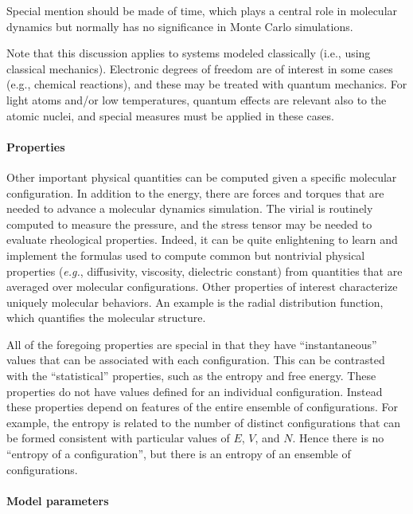 \documentclass[]{article}
\let\oldparagraph\paragraph
\renewcommand{\paragraph}[1]{\oldparagraph{#1}\mbox{}}
\begin{document}
Special mention should be made of time, which plays a central role in
molecular dynamics but normally has no significance in Monte Carlo
simulations.

Note that this discussion applies to systems modeled
classically (i.e., using classical mechanics). Electronic degrees of freedom
are of interest in some cases (e.g., chemical reactions), and these may be 
treated with quantum mechanics. For light atoms and/or low temperatures, 
quantum effects are relevant also to the atomic nuclei, and special measures
must be applied in these cases.

\paragraph{Properties}\label{properties}

Other important physical quantities can be computed given a specific
molecular configuration. In addition to the energy, there are forces and
torques that are needed to advance a molecular dynamics simulation. The
virial is routinely computed to measure the pressure, and the stress
tensor may be needed to evaluate rheological properties. Indeed, it can
be quite enlightening to learn and implement the formulas used to
compute common but nontrivial physical properties (\emph{e.g.},
diffusivity, viscosity, dielectric constant) from quantities that are
averaged over molecular configurations. Other properties of interest
characterize uniquely molecular behaviors. An example is the radial
distribution function, which quantifies the molecular structure.

All of the foregoing properties are special in that they have
``instantaneous'' values that can be associated with each configuration.
This can be contrasted with the ``statistical'' properties, such as the
entropy and free energy. These properties do not have values
defined for an individual configuration. Instead these properties depend
on features of the entire ensemble of configurations. For example, the
entropy is related to the number of distinct configurations that can be
formed consistent with particular values of $E$, $V$, and $N$. Hence there is
no ``entropy of a configuration'', but there is an entropy of an
ensemble of configurations.

\paragraph{Model parameters}\label{model-parameters}
\end{document}

